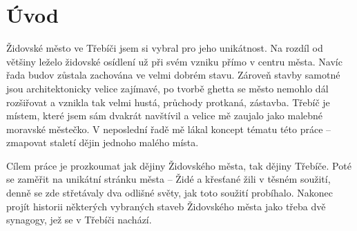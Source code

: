 \chapter*{Úvod}

Židovské město ve Třebíči jsem si vybral pro jeho unikátnost.
Na rozdíl od většiny leželo židovské osídlení už při svém vzniku přímo v centru města.
Navíc řada budov zůstala zachována ve velmi dobrém stavu.
Zároveň stavby samotné jsou architektonicky velice zajímavé, po tvorbě ghetta se město nemohlo dál rozšiřovat a vznikla tak velmi hustá, průchody protkaná, zástavba.
Třebíč je místem, které jsem sám dvakrát navštívil a velice mě zaujalo jako malebné moravské městečko.
V neposlední řadě mě lákal koncept tématu této práce -- zmapovat staletí dějin jednoho malého místa.

Cílem práce je prozkoumat jak dějiny Židovského města, tak dějiny Třebíče.
Poté se zaměřit na unikátní stránku města -- Židé a křesťané žili v těsném soužití, denně se zde střetávaly dva odlišné světy, jak toto soužití probíhalo.
Nakonec projít historii některých vybraných staveb Židovského města jako třeba dvě synagogy, jež se v Třebíči nachází.
